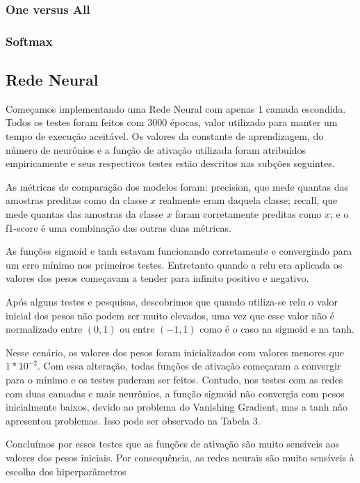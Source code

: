 \documentclass[conference]{IEEEtran}
\begin{document}
\subsubsection{One versus All}

\subsubsection{Softmax}

\subsection{Rede Neural}

	Começamos implementando uma Rede Neural com apenas 1 camada escondida. Todos os testes foram feitos com 3000 épocas, valor utilizado para manter um tempo de execução aceitável. Os valores da constante de aprendizagem, do número de neurônios e a função de ativação utilizada foram atribuídos empiricamente e seus respectivos testes estão descritos nas subções seguintes.
	
	As métricas de comparação dos modelos foram: precision, que mede quantas das amostras preditas como da classe $x$ realmente eram daquela classe; recall, que mede quantas das amostras da classe $x$ foram corretamente preditas como $x$; e o f1-score é uma combinação das outras duas métricas.
	
	As funções sigmoid e tanh estavam funcionando corretamente e convergindo para um erro mínimo nos primeiros testes. Entretanto quando a relu era aplicada os valores dos pesos começavam a tender para infinito positivo e negativo.
	
	Após alguns testes e pesquisas, descobrimos que quando utiliza-se relu o valor inicial dos pesos não podem ser muito elevados, uma vez que esse valor não é normalizado entre $(0,1)$ ou entre $(-1,1)$ como é o caso na sigmoid e na tanh.
	
	Nesse cenário, os valores dos pesos foram inicializados com valores menores que $1*10^{-2}$. Com essa alteração, todas funções de ativação começaram a convergir para o mínimo e os testes puderam ser feitos. Contudo, nos testes com as redes com duas camadas e mais neurônios, a função sigmoid não convergia com pesos inicialmente baixos, devido ao problema do Vanishing Gradient, mas a tanh não apresentou problemas. Isso pode ser observado na Tabela 3.
	
	Concluímos por esses testes que as funções de ativação são muito sensíveis aos valores dos pesos iniciais. Por consequência, as redes neurais são muito sensíveis à escolha dos hiperparâmetros
\end{document}
